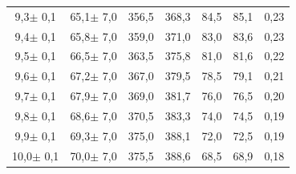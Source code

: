 \documentclass[titlepage = firstcover]{scrartcl}
\begin{document}
\begin{table}[h]
\begin{tabular}{c c c c c c c}
            9,3$\pm$ 0,1                &  65,1$\pm$ 7,0              &  356,5          &    368,3       &    84,5         &    85,1        &  0,23 \\
            9,4$\pm$ 0,1                &  65,8$\pm$ 7,0              &  359,0          &    371,0       &    83,0         &    83,6        &  0,23 \\
            9,5$\pm$ 0,1                &  66,5$\pm$ 7,0              &  363,5          &    375,8       &    81,0         &    81,6        &  0,22 \\
            9,6$\pm$ 0,1                &  67,2$\pm$ 7,0              &  367,0          &    379,5       &    78,5         &    79,1        &  0,21 \\
            9,7$\pm$ 0,1                &  67,9$\pm$ 7,0              &  369,0          &    381,7       &    76,0         &    76,5        &  0,20 \\
            9,8$\pm$ 0,1                &  68,6$\pm$ 7,0              &  370,5          &    383,3       &    74,0         &    74,5        &  0,19 \\
            9,9$\pm$ 0,1                &  69,3$\pm$ 7,0              &  375,0          &    388,1       &    72,0         &    72,5        &  0,19 \\
            10,0$\pm$ 0,1               &  70,0$\pm$ 7,0              &  375,5          &    388,6       &    68,5         &    68,9        &  0,18 \\
            \bottomrule
            
        \end{tabular}
        
    \end{table}
\end{document}
